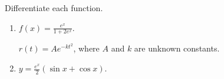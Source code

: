 Differentiate each function.  

\begin{enumerate}
\item $\displaystyle f(x) = \frac{e^x}{1+2e^x}$.  

  $r(t) = Ae^{-kt^2}$, where $A$ and $k$ are unknown constants.  

%

\item $\displaystyle y = \frac{e^x}{2}(\sin x + \cos x)$.  
\end{enumerate}
